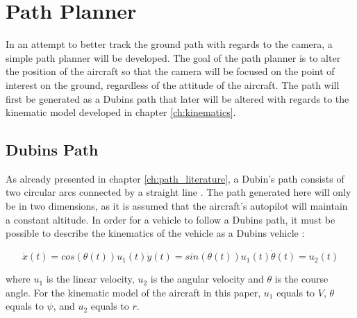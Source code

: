 \section{Path Planner}

In an attempt to better track the ground path with regards to the camera, a simple path planner will be developed. The goal of the path planner is to alter the position of the aircraft so that the camera will be focused on the point of interest on the ground, regardless of the attitude of the aircraft. The path will first be generated as a Dubins path that later will be altered with regards to the kinematic model developed in chapter \ref{ch:kinematics}.


\subsection{Dubins Path}
\label{ch:dubins_path}

As already presented in chapter \ref{ch:path_literature}, a Dubin's path consists of two circular arcs connected by a straight line \cite{DUBIN}. The path generated here will only be in two dimensions, as it is assumed that the aircraft's autopilot will maintain a constant altitude. In order for a vehicle to follow a Dubins path, it must be possible to describe the kinematics of the vehicle as a Dubins vehicle \cite{dubinYONG}:

\begin{subequations}
\begin{equation}
	\dot{x}(t) = cos(\theta(t))u_1(t)
\end{equation}
\begin{equation}
	\dot{y}(t) = sin(\theta(t))u_1(t)
\end{equation}
\begin{equation}
	\dot{\theta}(t) = u_2(t)
\end{equation}
\end{subequations}

where $u_1$ is the linear velocity, $u_2$ is the angular velocity and $\theta$ is the course angle. For the kinematic model of the aircraft in this paper, $u_1$ equals to $V$, $\theta$ equals to $\psi$, and $u_2$ equals to $r$.


